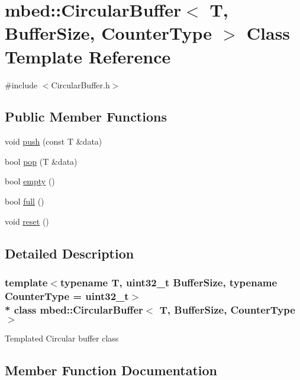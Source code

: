 \hypertarget{classmbed_1_1CircularBuffer}{}\section{mbed\+:\+:Circular\+Buffer$<$ T, Buffer\+Size, Counter\+Type $>$ Class Template Reference}
\label{classmbed_1_1CircularBuffer}


{\ttfamily \#include $<$Circular\+Buffer.\+h$>$}

\subsection*{Public Member Functions}
\begin{DoxyCompactItemize}
\item 
void \hyperlink{classmbed_1_1CircularBuffer_a7912eb5ef637aee9dec87ccc2c142027}{push} (const T \&data)
\item 
bool \hyperlink{classmbed_1_1CircularBuffer_ad3f648bd0c4c64dca2a4549eac41381c}{pop} (T \&data)
\item 
bool \hyperlink{classmbed_1_1CircularBuffer_a3d5c033b92daa3d0575702d3f0d9464d}{empty} ()
\item 
bool \hyperlink{classmbed_1_1CircularBuffer_a662aaf4fa7ef4e7aa0b9ee0d4a8e4f7a}{full} ()
\item 
void \hyperlink{classmbed_1_1CircularBuffer_aeaa832ce32a966c1605af04e988c273f}{reset} ()
\end{DoxyCompactItemize}


\subsection{Detailed Description}
\subsubsection*{template$<$typename T, uint32\+\_\+t Buffer\+Size, typename Counter\+Type = uint32\+\_\+t$>$\\*
class mbed\+::\+Circular\+Buffer$<$ T, Buffer\+Size, Counter\+Type $>$}

Templated Circular buffer class 

\subsection{Member Function Documentation}
